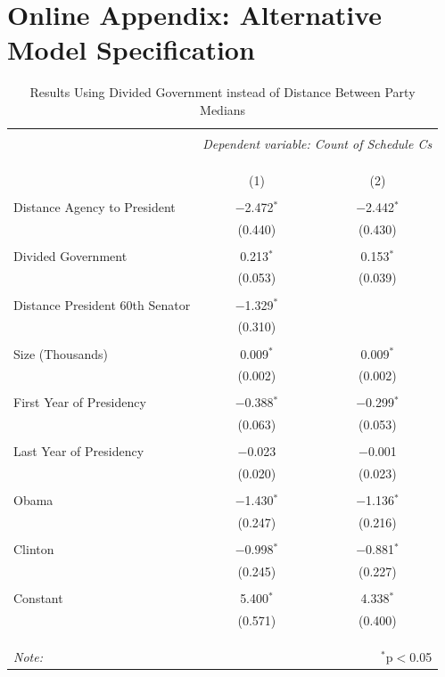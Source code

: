\documentclass[12pt]{article}
\begin{document}
\newpage
\section*{Online Appendix: Alternative Model Specification}
\begin{table}[!htbp] \centering 
  \caption{Results Using Divided Government instead of Distance Between Party Medians} 
  \label{} 
\begin{tabular}{@{\extracolsep{5pt}}lcc} 
\\[-1.8ex]\hline 
\hline \\[-1.8ex] 
 & \multicolumn{2}{c}{\textit{Dependent variable: Count of Schedule Cs}} \\ 
\cline{2-3} 
\\[-1.8ex] & \multicolumn{2}{c}{ } \\ 
\\[-1.8ex] & (1) & (2)\\ 
\hline \\[-1.8ex] 
 Distance Agency to President & $-$2.472$^{*}$ & $-$2.442$^{*}$ \\ 
  & (0.440) & (0.430) \\ 
  & & \\ 
 Divided Government& 0.213$^{*}$ & 0.153$^{*}$ \\ 
  & (0.053) & (0.039) \\ 
  & & \\ 
 Distance President 60th Senator & $-$1.329$^{*}$ &  \\ 
  & (0.310) &  \\ 
  & & \\ 
 Size (Thousands) & 0.009$^{*}$ & 0.009$^{*}$ \\ 
  & (0.002) & (0.002) \\ 
  & & \\ 
 First Year of Presidency & $-$0.388$^{*}$ & $-$0.299$^{*}$ \\ 
  & (0.063) & (0.053) \\ 
  & & \\ 
 Last Year of Presidency & $-$0.023 & $-$0.001 \\ 
  & (0.020) & (0.023) \\ 
  & & \\ 
 Obama & $-$1.430$^{*}$ & $-$1.136$^{*}$ \\ 
  & (0.247) & (0.216) \\ 
  & & \\ 
 Clinton & $-$0.998$^{*}$ & $-$0.881$^{*}$ \\ 
  & (0.245) & (0.227) \\ 
  & & \\ 
 Constant & 5.400$^{*}$ & 4.338$^{*}$ \\ 
  & (0.571) & (0.400) \\ 
  & & \\ 
\hline \\[-1.8ex] 
\hline 
\hline \\[-1.8ex] 
\textit{Note:}  & \multicolumn{2}{r}{$^{*}$p$<$0.05} \\ 
\end{tabular} 
\end{table}
\end{document}
